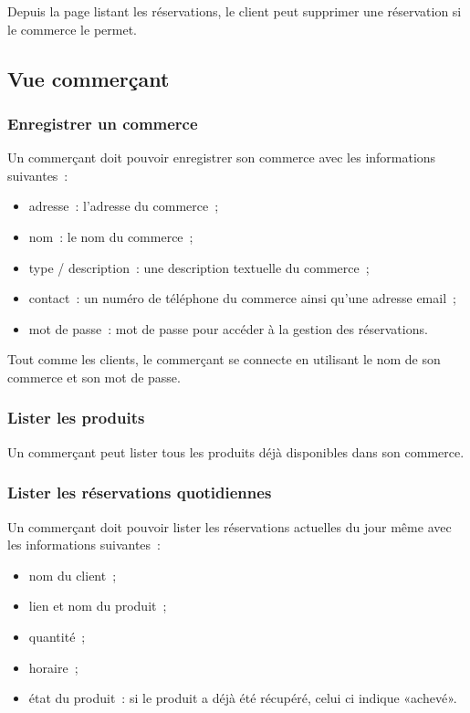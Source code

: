 \documentclass[a4paper,12pt]{article}
\begin{document}
Depuis la page listant les réservations, le client peut supprimer une réservation si le commerce le permet.

\subsection{Vue commerçant}

\subsubsection{Enregistrer un commerce}

Un commerçant doit pouvoir enregistrer son commerce avec les informations suivantes~:

\begin{itemize}
	\item adresse~: l'adresse du commerce~;
	\item nom~: le nom du commerce~;
	\item type / description~: une description textuelle du commerce~;
	\item contact~: un numéro de téléphone du commerce ainsi qu'une adresse email~;
	\item mot de passe~: mot de passe pour accéder à la gestion des réservations.
\end{itemize}

Tout comme les clients, le commerçant se connecte en utilisant le nom de son commerce et son mot de passe.

\subsubsection{Lister les produits}

Un commerçant peut lister tous les produits déjà disponibles dans son commerce.

\subsubsection{Lister les réservations quotidiennes}

Un commerçant doit pouvoir lister les réservations actuelles du jour même avec les informations suivantes~:

\begin{itemize}
	\item nom du client~;
	\item lien et nom du produit~;
	\item quantité~;
	\item horaire~;
	\item état du produit~: si le produit a déjà été récupéré, celui ci indique «achevé».
\end{itemize}
\end{document}
